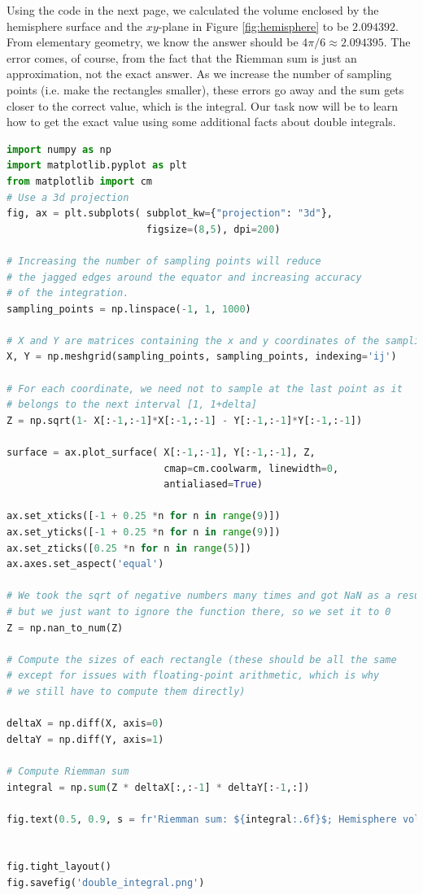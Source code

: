 Using the code in the next page, we calculated the volume enclosed by the hemisphere surface and the $xy$-plane in Figure \ref{fig:hemisphere} to be $2.094392$. From elementary geometry, we know the answer should be $4 \pi /6 \approx 2.094395$. The error comes, of course, from the fact that the Riemman sum is just an approximation, not the exact answer. As we increase the number of sampling points (i.e. make the rectangles smaller), these errors go away and the sum gets closer to the correct value, which is the integral. Our task now will be to learn how to get the exact value using some additional facts about double integrals.

\pagebreak

\begin{lstlisting}[language=Python]
import numpy as np
import matplotlib.pyplot as plt
from matplotlib import cm
# Use a 3d projection
fig, ax = plt.subplots( subplot_kw={"projection": "3d"}, 
                        figsize=(8,5), dpi=200)

# Increasing the number of sampling points will reduce
# the jagged edges around the equator and increasing accuracy
# of the integration.
sampling_points = np.linspace(-1, 1, 1000)

# X and Y are matrices containing the x and y coordinates of the sampling points
X, Y = np.meshgrid(sampling_points, sampling_points, indexing='ij')

# For each coordinate, we need not to sample at the last point as it
# belongs to the next interval [1, 1+delta]
Z = np.sqrt(1- X[:-1,:-1]*X[:-1,:-1] - Y[:-1,:-1]*Y[:-1,:-1])

surface = ax.plot_surface( X[:-1,:-1], Y[:-1,:-1], Z,
                           cmap=cm.coolwarm, linewidth=0, 
                           antialiased=True)

ax.set_xticks([-1 + 0.25 *n for n in range(9)])
ax.set_yticks([-1 + 0.25 *n for n in range(9)])
ax.set_zticks([0.25 *n for n in range(5)])
ax.axes.set_aspect('equal')

# We took the sqrt of negative numbers many times and got NaN as a result,
# but we just want to ignore the function there, so we set it to 0
Z = np.nan_to_num(Z)

# Compute the sizes of each rectangle (these should be all the same
# except for issues with floating-point arithmetic, which is why
# we still have to compute them directly)

deltaX = np.diff(X, axis=0)
deltaY = np.diff(Y, axis=1)

# Compute Riemman sum
integral = np.sum(Z * deltaX[:,:-1] * deltaY[:-1,:])

fig.text(0.5, 0.9, s = fr'Riemman sum: ${integral:.6f}$; Hemisphere volume: $4\pi / 6 \approx {np.pi * 4/6:.6f}$', size=14, horizontalalignment='center')


fig.tight_layout()
fig.savefig('double_integral.png')
\end{lstlisting}

